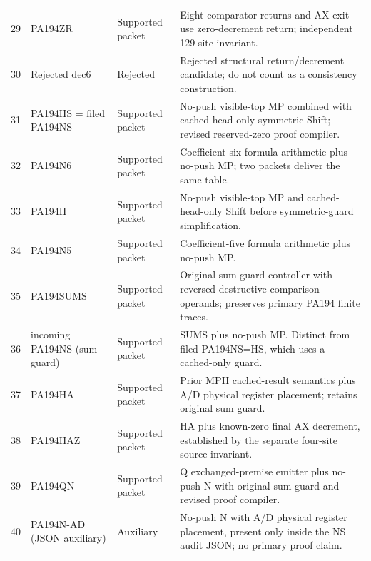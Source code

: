 {\begin{longtable}{@{}r >{\raggedright\arraybackslash}p{.21\linewidth}
 >{\raggedright\arraybackslash}p{.14\linewidth}
 >{\raggedright\arraybackslash}p{.54\linewidth}@{}}
29 & PA194ZR & Supported packet & Eight comparator returns and AX exit use zero-decrement return; independent 129-site invariant.\\[4pt]
30 & Rejected dec6 & Rejected & Rejected structural return/decrement candidate; do not count as a consistency construction.\\[4pt]
31 & PA194HS = filed PA194NS & Supported packet & No-push visible-top MP combined with cached-head-only symmetric Shift; revised reserved-zero proof compiler.\\[4pt]
32 & PA194N6 & Supported packet & Coefficient-six formula arithmetic plus no-push MP; two packets deliver the same table.\\[4pt]
33 & PA194H & Supported packet & No-push visible-top MP and cached-head-only Shift before symmetric-guard simplification.\\[4pt]
34 & PA194N5 & Supported packet & Coefficient-five formula arithmetic plus no-push MP.\\[4pt]
35 & PA194SUMS & Supported packet & Original sum-guard controller with reversed destructive comparison operands; preserves primary PA194 finite traces.\\[4pt]
36 & incoming PA194NS (sum guard) & Supported packet & SUMS plus no-push MP. Distinct from filed PA194NS=HS, which uses a cached-only guard.\\[4pt]
37 & PA194HA & Supported packet & Prior MPH cached-result semantics plus A/D physical register placement; retains original sum guard.\\[4pt]
38 & PA194HAZ & Supported packet & HA plus known-zero final AX decrement, established by the separate four-site source invariant.\\[4pt]
39 & PA194QN & Supported packet & Q exchanged-premise emitter plus no-push N with original sum guard and revised proof compiler.\\[4pt]
40 & PA194N-AD (JSON auxiliary) & Auxiliary & No-push N with A/D physical register placement, present only inside the NS audit JSON; no primary proof claim.\\[4pt]
\bottomrule\end{longtable}}
